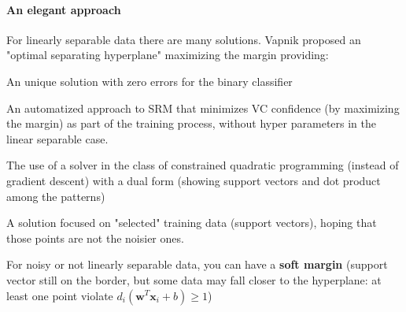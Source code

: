 \documentclass[10pt]{report}
\begin{document}
\paragraph{An elegant approach} For linearly separable data there are many solutions. Vapnik proposed an "optimal separating hyperplane" maximizing the margin providing:
\begin{list}{}{}
	\item An unique solution with zero errors for the binary classifier
	\item An automatized approach to SRM that minimizes VC confidence (by maximizing the margin) as part of the training process, without hyper parameters in the linear separable case.
	\item The use of a solver in the class of constrained quadratic programming (instead of gradient descent) with a dual form (showing support vectors and dot product among the patterns)
	\item A solution focused on "selected" training data (support vectors), hoping that those points are not the noisier ones.
\end{list}
For noisy or not linearly separable data, you can have a \textbf{soft margin} (support vector still on the border, but some data may fall closer to the hyperplane: at least one point violate $d_i(\mathbf{w}^T\mathbf{x}_i+b)\geq 1$)
\end{document}
